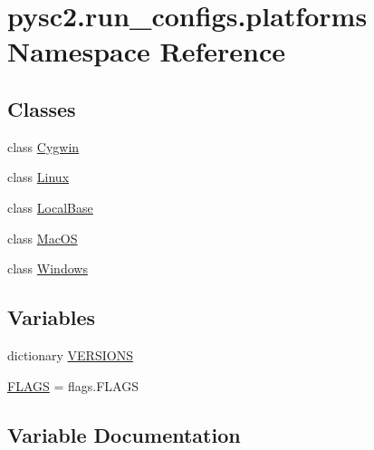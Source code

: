 \hypertarget{namespacepysc2_1_1run__configs_1_1platforms}{}\section{pysc2.\+run\+\_\+configs.\+platforms Namespace Reference}
\label{namespacepysc2_1_1run__configs_1_1platforms}
\subsection*{Classes}
\begin{DoxyCompactItemize}
\item 
class \mbox{\hyperlink{classpysc2_1_1run__configs_1_1platforms_1_1_cygwin}{Cygwin}}
\item 
class \mbox{\hyperlink{classpysc2_1_1run__configs_1_1platforms_1_1_linux}{Linux}}
\item 
class \mbox{\hyperlink{classpysc2_1_1run__configs_1_1platforms_1_1_local_base}{Local\+Base}}
\item 
class \mbox{\hyperlink{classpysc2_1_1run__configs_1_1platforms_1_1_mac_o_s}{Mac\+OS}}
\item 
class \mbox{\hyperlink{classpysc2_1_1run__configs_1_1platforms_1_1_windows}{Windows}}
\end{DoxyCompactItemize}
\subsection*{Variables}
\begin{DoxyCompactItemize}
\item 
dictionary \mbox{\hyperlink{namespacepysc2_1_1run__configs_1_1platforms_aeccba4e9f636af93aa60c2e34b85674f}{V\+E\+R\+S\+I\+O\+NS}}
\item 
\mbox{\hyperlink{namespacepysc2_1_1run__configs_1_1platforms_a5c7fa28f05507c849c00d25fc7879784}{F\+L\+A\+GS}} = flags.\+F\+L\+A\+GS
\end{DoxyCompactItemize}


\subsection{Variable Documentation}
\mbox{\label{namespacepysc2_1_1run__configs_1_1platforms_a5c7fa28f05507c849c00d25fc7879784}} 
